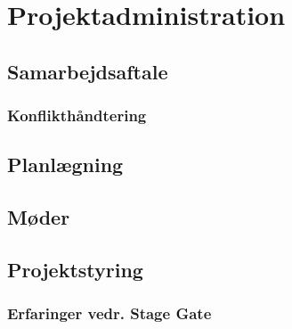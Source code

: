 \chapter{Projektadministration}

\section{Samarbejdsaftale}

	\subsection{Konflikthåndtering}

\section{Planlægning}
\section{Møder}
\section{Projektstyring}

	\subsection{Erfaringer vedr. Stage Gate}

